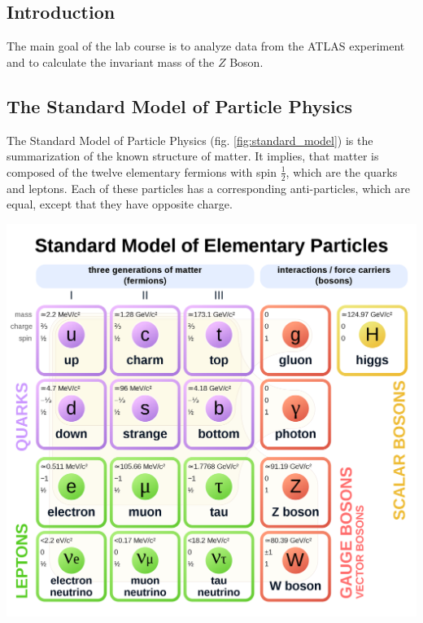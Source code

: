 \documentclass[12pt, a4paper, bibliography=totoc]{scrartcl}
\begin{document}
\tableofcontents
\newpage
\begin{multicols}{2}
\section{Introduction}

The main goal of the lab course is to analyze data from the ATLAS experiment and 
to calculate the invariant mass of the $Z$ Boson. 

\subsection{The Standard Model of Particle Physics}

The Standard Model of Particle Physics (fig. \ref{fig:standard_model}) is the summarization of the known structure of matter.
It implies, that matter is composed of the twelve elementary fermions with spin $\frac{1}{2}$, which are the quarks and leptons. 
Each of these particles has a corresponding anti-particles, which are equal, except that they have opposite charge.

    \begin{center}
    \includegraphics[width=0.9\linewidth]{fig/standard_model.png}
\label{fig:standard_model}
    \end{center}


\end{multicols}
\end{document}
